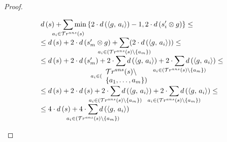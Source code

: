 \begin{proof}
\begin{enumerate}
   \[ \begin{array}{l}
  d\,(s) + \smashoperator[lr]{\sum\limits_{a_i \in \tra{s}}} \min\,\{2\cdot d\,(\taskst{g}{a_i}) - 1, 2\cdot d\,(s'_i \otimes g)\}  \le \\
  \le d\,(s) + 2 \cdot d\,(s'_m \otimes g) + \smashoperator[lr]{\sum\limits_{a_i \in (\tra{s} \setminus \{a_m\})}} (2\cdot d\,(\taskst{g}{a_i})) \le \\
  \le d\,(s) + 2 \cdot d\,(s'_m) + 2\cdot\smashoperator[lr]{\sum\limits_{a_i \in (\begin{array}{l} \tra{s} \setminus \\ \{a_1, \dots, a_m\}) \end{array}}} d\,(\taskst{g}{a_i}) + 2\cdot\smashoperator[lr]{\sum\limits_{a_i \in (\tra{s} \setminus \{a_m\})}} d\,(\taskst{g}{a_i}) \le \\
  \le d\,(s) + 2 \cdot d\,(s) + 2\cdot\smashoperator[lr]{\sum\limits_{a_i \in (\tra{s} \setminus \{a_m\})}} d\,(\taskst{g}{a_i}) + 2\cdot\smashoperator[lr]{\sum\limits_{a_i \in (\tra{s} \setminus \{a_m\})}} d\,(\taskst{g}{a_i}) \le \\
  \le 4 \cdot d\,(s) + 4\cdot\smashoperator[lr]{\sum\limits_{a_i \in (\tra{s} \setminus \{a_m\})}} d\,(\taskst{g}{a_i}) \\
  \end{array} \]

\end{enumerate}

\end{proof}


